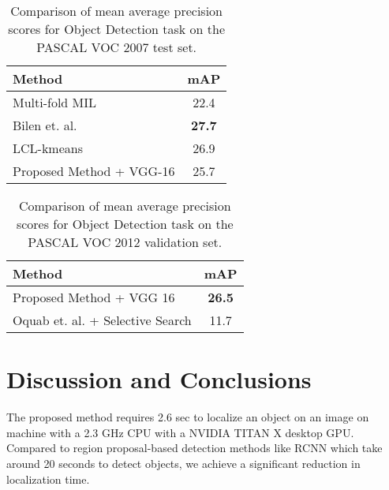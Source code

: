 \documentclass[runningheads]{llncs}
\begin{document}
\begin{table}[]
\footnotesize
\setlength{\tabcolsep}{2pt}
\centering
\begin{tabular}{|l|c|}
\hline
\textbf{Method}                         & \multicolumn{1}{l|}{\textbf{mAP}} \\ \hline
Multi-fold MIL \cite{cinbis2014multi} & 22.4                                   \\ \hline
Bilen et. al. \cite{bilen2015weakly}  & \textbf{27.7}                                   \\ \hline
LCL-kmeans \cite{wang2014weakly}      & 26.9                                   \\ \hline
Proposed Method + VGG-16                & 25.7                                   \\ \hline
\end{tabular}
\caption{Comparison of mean average precision scores for Object Detection task on the PASCAL VOC 2007 test set.}
\label{table:detectionscores}
\end{table}


\begin{table}[]
\centering

\label{my-label}
\begin{tabular}{|l|c|}
\hline
\textbf{Method}                                                     & \multicolumn{1}{l|}{\textbf{mAP}} \\ \hline
Proposed Method + VGG 16                                            & \textbf{26.5}                     \\ \hline
Oquab et. al. \cite{oquabobject} + Selective Search \cite{uijlings2013selective} & 11.7                              \\ \hline
\end{tabular}
\caption{Comparison of mean average precision scores for Object Detection
task on the PASCAL VOC 2012 validation set.}
\label{table:2012detectionscores}
\end{table}

\section{Discussion and Conclusions}\label{section:Discussion}
The proposed method requires 2.6 sec to localize an object on an image on machine with a 2.3 GHz CPU with a NVIDIA TITAN X desktop GPU. Compared to region proposal-based detection methods like RCNN which take around 20 seconds to detect objects, we achieve a significant reduction in localization time.
\end{document}
